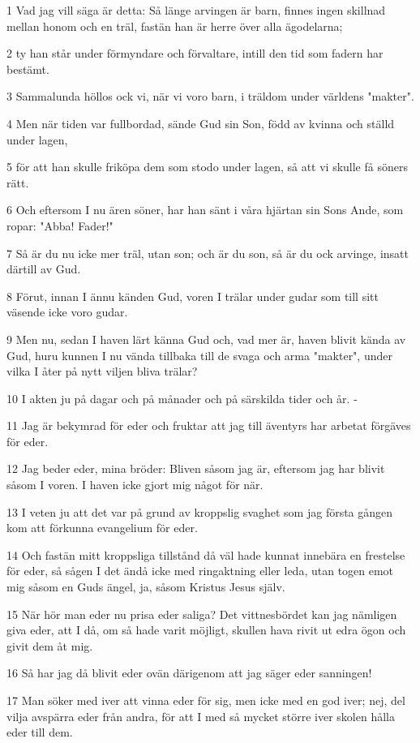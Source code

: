 \par 1 Vad jag vill säga är detta: Så länge arvingen är barn, finnes ingen skillnad mellan honom och en träl, fastän han är herre över alla ägodelarna;
\par 2 ty han står under förmyndare och förvaltare, intill den tid som fadern har bestämt.
\par 3 Sammalunda höllos ock vi, när vi voro barn, i träldom under världens "makter".
\par 4 Men när tiden var fullbordad, sände Gud sin Son, född av kvinna och ställd under lagen,
\par 5 för att han skulle friköpa dem som stodo under lagen, så att vi skulle få söners rätt.
\par 6 Och eftersom I nu ären söner, har han sänt i våra hjärtan sin Sons Ande, som ropar: "Abba! Fader!"
\par 7 Så är du nu icke mer träl, utan son; och är du son, så är du ock arvinge, insatt därtill av Gud.
\par 8 Förut, innan I ännu känden Gud, voren I trälar under gudar som till sitt väsende icke voro gudar.
\par 9 Men nu, sedan I haven lärt känna Gud och, vad mer är, haven blivit kända av Gud, huru kunnen I nu vända tillbaka till de svaga och arma "makter", under vilka I åter på nytt viljen bliva trälar?
\par 10 I akten ju på dagar och på månader och på särskilda tider och år. -
\par 11 Jag är bekymrad för eder och fruktar att jag till äventyrs har arbetat förgäves för eder.
\par 12 Jag beder eder, mina bröder: Bliven såsom jag är, eftersom jag har blivit såsom I voren. I haven icke gjort mig något för när.
\par 13 I veten ju att det var på grund av kroppslig svaghet som jag första gången kom att förkunna evangelium för eder.
\par 14 Och fastän mitt kroppsliga tillstånd då väl hade kunnat innebära en frestelse för eder, så sågen I det ändå icke med ringaktning eller leda, utan togen emot mig såsom en Guds ängel, ja, såsom Kristus Jesus själv.
\par 15 När hör man eder nu prisa eder saliga? Det vittnesbördet kan jag nämligen giva eder, att I då, om så hade varit möjligt, skullen hava rivit ut edra ögon och givit dem åt mig.
\par 16 Så har jag då blivit eder ovän därigenom att jag säger eder sanningen!
\par 17 Man söker med iver att vinna eder för sig, men icke med en god iver; nej, del vilja avspärra eder från andra, för att I med så mycket större iver skolen hålla eder till dem.
